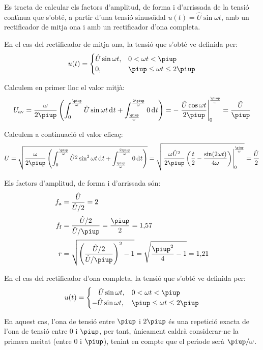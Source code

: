 \begin{exemple}
Es tracta de calcular els factors d'amplitud, de forma i d'arrissada
de la tensi\'{o} cont\'{\i}nua que s'obt\'{e}, a partir d'una tensi\'{o} sinuso\"{\i}dal
$u(t) = \hat{U} \sin\omega t$, amb un rectificador de mitja ona i
amb un rectificador d'ona completa.

En el cas del rectificador de mitja ona, la tensi\'{o} que s'obt\'{e} ve
definida per:
\[
u(t) = \begin{cases} \hat{U} \sin\omega t, & 0 < \omega t < \piup\\
       0, & \piup \leq \omega t \leq 2\piup \end{cases}
\]

Calculem en primer lloc el valor mitj\`{a}:
\[
U\ped{av} = \frac{\omega}{2\piup} \left( \int_0^\frac{\piup}{\omega}
\hat{U} \sin\omega t \diff t +
\int_\frac{\piup}{\omega}^\frac{2\piup}{\omega} 0 \diff t \right) = -
\left. \frac{\hat{U} \cos\omega t}{2\piup}
\right|_0^\frac{\piup}{\omega} = \frac{\hat{U}}{\piup}
\]

Calculem a continuaci\'{o} el valor efica\c{c}:
\[
U = \sqrt{\frac{\omega}{2\piup} \left( \int_0^\frac{\piup}{\omega}
\hat{U}^2 \sin^2\omega t \diff t +
\int_\frac{\piup}{\omega}^\frac{2\piup}{\omega} 0 \diff t \right)} =
  \sqrt{\left.\frac{\omega \hat{U}^2}{2\piup}\left( \frac{t}{2} -
\frac{\sin (2\omega t)}{4\omega}
\right)\right|_0^\frac{\piup}{\omega}} = \frac{\hat{U}}{2}
\]

Els factors d'amplitud, de forma i d'arrissada s\'{o}n:
\begin{align*}
    f\ped{a} &= \frac{\hat{U}}{\hat{U}/2} = 2 \\[0.5ex]
    f\ped{f} &= \frac{\hat{U}/2}{\hat{U}/\piup} =\frac{\piup}{2} =
    1{,}57 \\[0.5ex]
    r &= \sqrt{\left(\frac{\hat{U}/2}{\hat{U}/\piup}\right)^2-1} =
\sqrt{\frac{\piup^2}{4}-1} = 1{,}21
\end{align*}


En el cas del rectificador d'ona completa, la tensi\'{o} que s'obt\'{e} ve
definida per:
\[
u(t) = \begin{cases} \rule{3.2mm}{0pt}\hat{U} \sin\omega t, & 0 < \omega t < \piup\\
       -\hat{U} \sin\omega t, & \piup \leq \omega t \leq 2\piup \end{cases}
\]

En aquest cas, l'ona de tensi\'{o} entre $\piup$ i $2\piup$ \'{e}s una repetici\'{o}
exacta de l'ona de tensi\'{o} entre 0 i $\piup$, per tant, \'{u}nicament
caldr\`{a} considerar-ne la primera meitat (entre 0 i $\piup$), tenint en
compte que el per\'{\i}ode ser\`{a} $\piup/\omega$.


\end{exemple}
